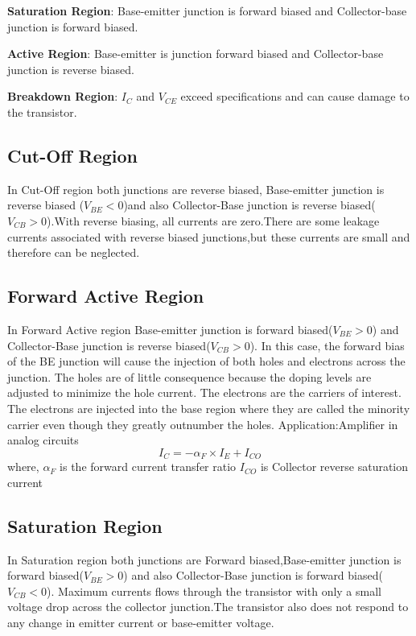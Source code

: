 			\textbf{Saturation Region}: Base-emitter junction is forward biased and Collector-base junction is forward biased.
			
			\textbf{Active Region}: Base-emitter is junction forward biased and Collector-base junction is reverse biased.
			
			\textbf{Breakdown Region}: \(I_C\) and \(V_{CE}\) exceed specifications and can cause damage to the transistor.
			
		\subsection{Cut-Off Region}
			In Cut-Off region both junctions are reverse biased, Base-emitter junction is reverse biased (\(V_{BE}<0\))and also Collector-Base junction is reverse biased(\(V_{CB}>0\)).With reverse biasing, all currents are zero.There are some leakage currents associated with reverse biased junctions,but these currents are small and therefore can be neglected.
		
		\subsection{Forward Active Region}
			In Forward Active region Base-emitter junction is forward biased(\(V_{BE}>0\)) and Collector-Base junction is reverse biased(\(V_{CB}>0\)). In this case, the forward bias of the BE junction will cause the injection of both holes and electrons across the junction. The holes are of little consequence because the doping levels are adjusted to minimize the hole current. The electrons are the carriers of interest. The electrons are injected into the base region where they are called the minority carrier even though they greatly outnumber the holes.
			Application:Amplifier in analog circuits						
			$$I_C= -\alpha_F \times I_E + I_{CO}$$
			where,
			\(\alpha_F\) is the forward current transfer ratio
			\(I_{CO}\) is Collector reverse saturation current
		
		\subsection{Saturation Region}
			In Saturation region both junctions are Forward biased,Base-emitter junction is forward biased(\(V_{BE}>0\)) and also Collector-Base junction is forward biased(\(V_{CB}<0\)). Maximum currents flows through the transistor with only a small voltage drop across the collector junction.The transistor also does not respond to any change in emitter current or base-emitter voltage.
		
